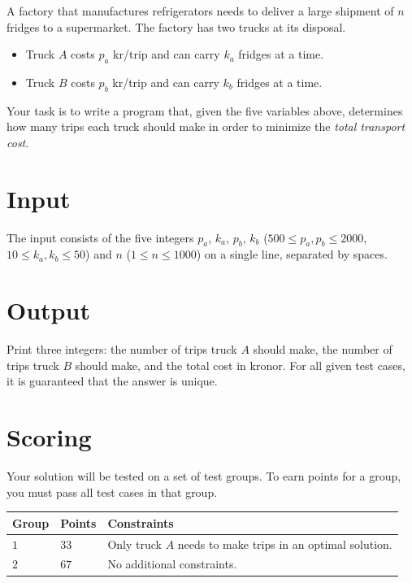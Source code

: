 
A factory that manufactures refrigerators needs to deliver a large shipment of $n$ fridges to a supermarket. The factory has two trucks at its disposal.

\begin{itemize}
  \item Truck $A$ costs $p_a$ kr/trip and can carry $k_a$ fridges at a time.
  \item Truck $B$ costs $p_b$ kr/trip and can carry $k_b$ fridges at a time.
\end{itemize}

Your task is to write a program that, given the five variables above, determines how many trips each truck should make in order to minimize the \emph{total transport cost}.

\section*{Input}
The input consists of the five integers $p_a$, $k_a$, $p_b$, $k_b$ ($500 \leq p_a, p_b \leq 2000$, $10 \leq k_a, k_b \leq 50$) and $n$ ($1 \leq n \leq 1000$) on a single line, separated by spaces.

\section*{Output}
Print three integers: the number of trips truck $A$ should make, the number of trips truck $B$ should make, and the total cost in kronor.
For all given test cases, it is guaranteed that the answer is unique.

\section*{Scoring}
Your solution will be tested on a set of test groups.
To earn points for a group, you must pass all test cases in that group.

\noindent
\begin{tabular}{| l | l | p{12cm} |}
  \hline
  \textbf{Group} & \textbf{Points} & \textbf{Constraints} \\ \hline
  $1$    & $33$        &  Only truck $A$ needs to make trips in an optimal solution. \\ \hline
  $2$    & $67$        &  No additional constraints. \\ \hline
\end{tabular}
